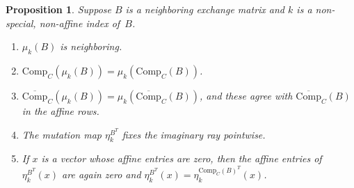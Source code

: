 \documentclass{amsart}
\newtheorem{proposition}{Proposition}[section]
\theoremstyle{definition}
\theoremstyle{remark}
\numberwithin{equation}{section}
\newcommand{\reals}{\mathbb R}
\newcommand{\0}{{\mathbf{0}}}
\newcommand{\Comp}{\mathrm{Comp}_C}
\newcommand{\CompPlus}{\overline{\mathrm{Comp}}_C}
\begin{document}
\begin{proposition}\label{nonspecial mut}
Suppose $B$ is a neighboring exchange matrix and $k$ is a non-special, non-affine index of~$B$.
\begin{enumerate}[label=\bf\arabic*., ref=\arabic*]
\item
$\mu_k(B)$ is neighboring.
\item
$\Comp(\mu_k(B))=\mu_k(\Comp(B))$.
\item
$\CompPlus(\mu_k(B))=\mu_k(\CompPlus(B))$, and these agree with $\CompPlus(B)$ in the affine rows.
\item
The mutation map $\eta^{B^T}_k$ fixes the imaginary ray pointwise.
\item
If $x$ is a vector whose affine entries are zero, then the affine entries of $\eta^{B^T}_k(x)$ are again zero and $\eta^{B^T}_k(x)=\eta^{\Comp(B)^T}_k(x)$.
\end{enumerate}
\end{proposition}
\end{document}
